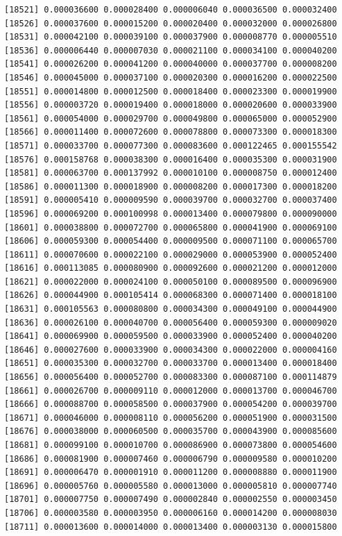 \documentclass[]{article}
\begin{document}
\begin{verbatim}
[18521] 0.000036600 0.000028400 0.000006040 0.000036500 0.000032400
[18526] 0.000037600 0.000015200 0.000020400 0.000032000 0.000026800
[18531] 0.000042100 0.000039100 0.000037900 0.000008770 0.000005510
[18536] 0.000006440 0.000007030 0.000021100 0.000034100 0.000040200
[18541] 0.000026200 0.000041200 0.000040000 0.000037700 0.000008200
[18546] 0.000045000 0.000037100 0.000020300 0.000016200 0.000022500
[18551] 0.000014800 0.000012500 0.000018400 0.000023300 0.000019900
[18556] 0.000003720 0.000019400 0.000018000 0.000020600 0.000033900
[18561] 0.000054000 0.000029700 0.000049800 0.000065000 0.000052900
[18566] 0.000011400 0.000072600 0.000078800 0.000073300 0.000018300
[18571] 0.000033700 0.000077300 0.000083600 0.000122465 0.000155542
[18576] 0.000158768 0.000038300 0.000016400 0.000035300 0.000031900
[18581] 0.000063700 0.000137992 0.000010100 0.000008750 0.000012400
[18586] 0.000011300 0.000018900 0.000008200 0.000017300 0.000018200
[18591] 0.000005410 0.000009590 0.000039700 0.000032700 0.000037400
[18596] 0.000069200 0.000100998 0.000013400 0.000079800 0.000090000
[18601] 0.000038800 0.000072700 0.000065800 0.000041900 0.000069100
[18606] 0.000059300 0.000054400 0.000009500 0.000071100 0.000065700
[18611] 0.000070600 0.000022100 0.000029000 0.000053900 0.000052400
[18616] 0.000113085 0.000080900 0.000092600 0.000021200 0.000012000
[18621] 0.000022000 0.000024100 0.000050100 0.000089500 0.000096900
[18626] 0.000044900 0.000105414 0.000068300 0.000071400 0.000018100
[18631] 0.000105563 0.000080800 0.000034300 0.000049100 0.000044900
[18636] 0.000026100 0.000040700 0.000056400 0.000059300 0.000009020
[18641] 0.000069900 0.000059500 0.000033900 0.000052400 0.000040200
[18646] 0.000027600 0.000033900 0.000034300 0.000022000 0.000004160
[18651] 0.000035300 0.000032700 0.000033700 0.000013400 0.000018400
[18656] 0.000056400 0.000052700 0.000083300 0.000087100 0.000114879
[18661] 0.000026700 0.000009110 0.000012000 0.000013700 0.000046700
[18666] 0.000088700 0.000058500 0.000037900 0.000054200 0.000039700
[18671] 0.000046000 0.000008110 0.000056200 0.000051900 0.000031500
[18676] 0.000038000 0.000060500 0.000035700 0.000043900 0.000085600
[18681] 0.000099100 0.000010700 0.000086900 0.000073800 0.000054600
[18686] 0.000081900 0.000007460 0.000006790 0.000009580 0.000010200
[18691] 0.000006470 0.000001910 0.000011200 0.000008880 0.000011900
[18696] 0.000005760 0.000005580 0.000013000 0.000005810 0.000007740
[18701] 0.000007750 0.000007490 0.000002840 0.000002550 0.000003450
[18706] 0.000003580 0.000003950 0.000006160 0.000014200 0.000008030
[18711] 0.000013600 0.000014000 0.000013400 0.000003130 0.000015800

\end{verbatim}
\end{document}
